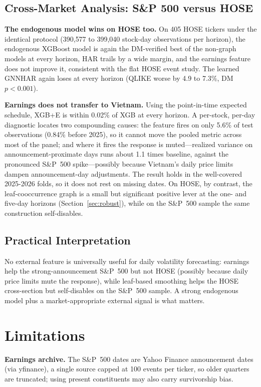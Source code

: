 \documentclass[runningheads,a4paper]{llncs}
\begin{document}
\subsection{Cross-Market Analysis: S\&P 500 versus HOSE}\label{sec:hose}
\textbf{The endogenous model wins on HOSE too.} On 405 HOSE tickers under the identical protocol
(390{,}577 to 399{,}040 stock-day observations per horizon), the endogenous XGBoost model is again the
DM-verified best of the non-graph models at every horizon, HAR trails by a wide margin, and the earnings
feature does not improve it, consistent with the flat HOSE event study. The learned GNNHAR again loses at
every horizon (QLIKE worse by 4.9 to 7.3\%, DM $p<0.001$).

\textbf{Earnings does not transfer to Vietnam.} Using the point-in-time expected schedule, XGB+E is within
0.02\% of XGB at every horizon. A per-stock, per-day diagnostic locates two compounding causes: the feature
fires on only 5.6\% of test observations (0.84\% before 2025), so it cannot move the pooled metric across
most of the panel; and where it fires the response is muted---realized variance on announcement-proximate
days runs about 1.1 times baseline, against the pronounced S\&P~500 spike---possibly because Vietnam's
daily price limits dampen announcement-day adjustments. The result holds in the well-covered 2025-2026
folds, so it does not rest on missing dates. On HOSE, by contrast, the leaf-cooccurrence graph is a small
but significant positive lever at the one- and five-day horizons (Section~\ref{sec:robust}), while on the
S\&P~500 sample the same construction self-disables.

\subsection{Practical Interpretation}
No external feature is universally useful for daily volatility forecasting: earnings help the
strong-announcement S\&P~500 but not HOSE (possibly because daily price limits mute the response), while
leaf-based smoothing helps the HOSE cross-section but self-disables on the S\&P~500 sample. A strong
endogenous model plus a market-appropriate external signal is what matters.

\FloatBarrier
\section{Limitations}
\noindent\textbf{Earnings archive.} The S\&P~500 dates are Yahoo Finance announcement dates (via
yfinance), a single source capped at 100 events per ticker, so older quarters are truncated; using present
constituents may also carry survivorship bias.
\end{document}
